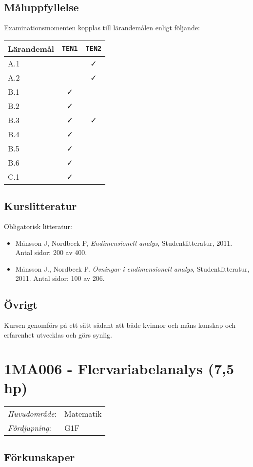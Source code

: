 \subsection*{Måluppfyllelse}

Examinationsmomenten kopplas till lärandemålen enligt följande:

\begin{longtable}[]{@{}lcc@{}}
\toprule
\textsf{Lärandemål} & \texttt{TEN1} & \texttt{TEN2}\tabularnewline
\midrule
\endhead
A.1 & & \faCheck\tabularnewline
A.2 & & \faCheck\tabularnewline
B.1 & \faCheck &\tabularnewline
B.2 & \faCheck &\tabularnewline
B.3 & \faCheck & \faCheck\tabularnewline
B.4 & \faCheck &\tabularnewline
B.5 & \faCheck &\tabularnewline
B.6 & \faCheck &\tabularnewline
C.1 & \faCheck &\tabularnewline
\bottomrule
\end{longtable}

\subsection*{Kurslitteratur}

Obligatorisk litteratur:

\begin{itemize}
\tightlist
\item
  Månsson J, Nordbeck P, \emph{Endimensionell analys},
  Studentlitteratur, 2011. Antal sidor: 200 av 400.
\item
  Månsson J., Nordbeck P. \emph{Övningar i endimensionell analys},
  Studentlitteratur, 2011. Antal sidor: 100 av 206.
\end{itemize}

\subsection*{Övrigt}

Kursen genomförs på ett sätt sådant att både kvinnor och mäns kunskap och erfarenhet utvecklas och görs synlig.
\pagebreak
\section*{1MA006 - Flervariabelanalys (7,5 hp)}

\begin{tabular}{ll}\emph{Huvudområde}: & Matematik\tabularnewline\emph{Fördjupning}: & G1F\tabularnewline\end{tabular}

\subsection*{Förkunskaper}

